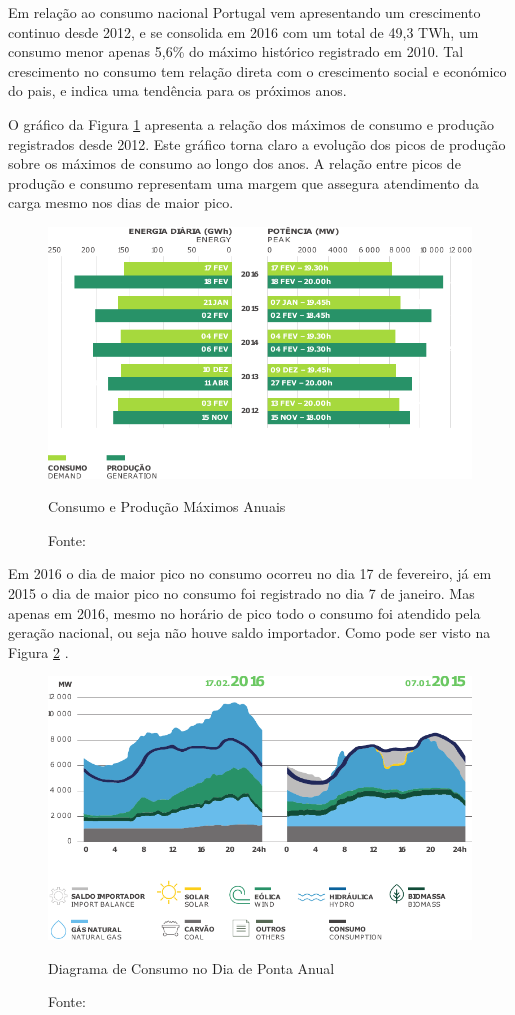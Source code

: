 Em relação ao consumo nacional Portugal vem apresentando um crescimento continuo desde 2012, e se consolida em 2016 com um total de  49,3 TWh, um consumo menor apenas 5,6\% do máximo histórico registrado em 2010. Tal crescimento no consumo tem relação direta com o crescimento social e económico do pais, e indica uma tendência para os próximos anos\cite[p.~6]{REN}. 

O gráfico da Figura \ref{fig:ConsumoMax} apresenta a relação dos máximos de consumo e produção registrados desde 2012. Este gráfico torna claro a evolução dos picos de produção sobre os máximos de consumo ao longo dos anos. A relação entre picos de produção e consumo representam uma margem que assegura atendimento da carga mesmo nos dias de maior pico.

\begin{figure}[H]
	\centering
	\captionsetup{width=0.7\textwidth, font=footnotesize, textfont=bf}	
	\includegraphics[width=0.7\linewidth]{img/ConsumoEProducaoMaximosAnuais.pdf}
	\caption{Consumo e Produção Máximos Anuais}
	\vspace{-3.5mm}
	\caption*{Fonte: }
	\label{fig:ConsumoMax}
\end{figure}

Em 2016 o dia de maior pico no consumo ocorreu no dia 17 de fevereiro, já em 2015 o dia de maior pico no consumo foi registrado no dia 7 de janeiro. Mas apenas em  2016, mesmo no horário de pico todo o consumo foi atendido pela geração nacional, ou seja não houve saldo importador. Como pode ser visto na Figura \ref{fig:ConsumoDiaDePontaAnual} \cite{apren}.

\begin{figure}[H]
	\centering
	\captionsetup{width=0.7\textwidth, font=footnotesize, textfont=bf}	
	\includegraphics[width=0.7\linewidth]{img/ConsumoDiaDePontaAnual.pdf}
	\caption{Diagrama de Consumo no Dia de Ponta Anual}
	\vspace{-3.5mm}
	\caption*{Fonte: }
	\label{fig:ConsumoDiaDePontaAnual}
\end{figure}

